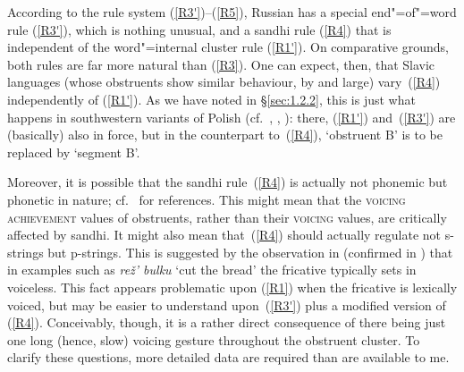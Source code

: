 \documentclass[output=paper]{langsci/langscibook}
\begin{document}
\begin{sloppypar}
According to the rule system (\ref{R3'})--(\ref{R5}), Russian has a special
end"=of"=word rule (\ref{R3'}), which is nothing unusual, and a sandhi
rule (\ref{R4}) that is independent of the word"=internal cluster
rule (\ref{R1'}). On comparative grounds, both rules are far more natural
than (\ref{R3}). One can expect, then, that Slavic languages (whose
obstruents show similar behaviour, by and large) vary~(\ref{R4})
independently of (\ref{R1'}). As we have noted in \S\ref{sec:1.2.2}, this is
just what happens in southwestern variants of
Polish (cf.\ \citealt{beth:84},
\citealt[34 and~54]{guss:92}, \citealt[72
and~82\hspace{1pt}f.\@]{ruba:96}): there, (\ref{R1'})
and~(\ref{R3'}) are (basically) also in force, but in the counterpart
to~(\ref{R4}), `obstruent B' is to be replaced by `segment B'.
\end{sloppypar}

Moreover, it is possible that the sandhi rule~(\ref{R4}) is actually not
phonemic but phonetic in nature; cf.\ \cite{kipa:85} for
references. This might mean that the \textsc{voicing achievement} values of
obstruents, rather than their \textsc{voicing} values, are critically affected
by sandhi. It might also mean that~(\ref{R4}) should actually regulate not
s-strings but p-strings. This is suggested by the observation
in \cite[415]{isac:54} (confirmed
in \citealt[64, note~15]{hall:59}) that in examples such
as \emph{re\v{z}' bulku} `cut the bread' the fricative typically sets in
voiceless.  This fact appears problematic upon (\ref{R1}) when the
fricative is lexically voiced, but may be easier to understand
upon~(\ref{R3'}) plus a modified version of (\ref{R4}). Conceivably,
though, it is a rather direct consequence of there being just one long
(hence, slow) voicing gesture throughout the obstruent cluster. To clarify
these questions, more detailed data are required than are available to me.
\end{document}
